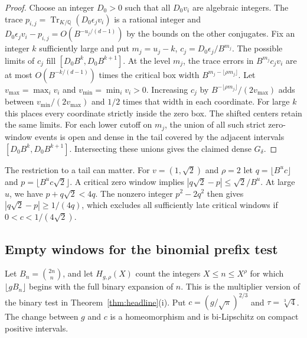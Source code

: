 \documentclass[11pt,reqno,a4paper]{amsart}
\theoremstyle{remark}
\begin{document}
\begin{proof}
Choose an integer \(D_0>0\) such that all \(D_0v_i\) are
algebraic integers. The trace
\(p_{i,j}=\operatorname{Tr}_{K/\mathbb Q}(D_0\epsilon_jv_i)\)
is a rational integer and
\(D_0\epsilon_jv_i-p_{i,j}=O(B^{-u_j/(d-1)})\) by the bounds on
the other conjugates. Fix an integer \(k\) sufficiently large
and put \(m_j=u_j-k\), \(c_j=D_0\epsilon_j/B^{m_j}\).
The possible limits of \(c_j\) fill
\([D_0B^k,D_0B^{k+1}]\). At the level \(m_j\), the trace errors
in \(B^{m_j}c_jv_i\) are at most \(O(B^{-k/(d-1)})\) times the
critical box width \(B^{m_j-\lfloor\rho m_j\rfloor}\).
Let \(v_{\max}=\max_i v_i\) and \(v_{\min}=\min_i v_i>0\).
Increasing \(c_j\) by
\(B^{-\lfloor\rho m_j\rfloor}/(2v_{\max})\) adds between
\(v_{\min}/(2v_{\max})\) and \(1/2\) times that width in each
coordinate. For large \(k\) this places every coordinate
strictly inside the zero box. The shifted centers retain the
same limits. For each lower cutoff on \(m_j\), the union of all
such strict zero-window events is open and dense in the tail
covered by the adjacent intervals
\([D_0B^k,D_0B^{k+1}]\). Intersecting these unions gives the
claimed dense \(G_\delta\).
\end{proof}

The restriction to a tail can matter. For \(v=(1,\sqrt2)\) and
\(\rho=2\) let \(q=\lfloor B^u c\rfloor\) and
\(p=\lfloor B^u c\sqrt2\rfloor\). A critical zero window implies
\(|q\sqrt2-p|\leq\sqrt2/B^u\). At large \(u\), we have
\(p+q\sqrt2<4q\). The nonzero integer \(p^2-2q^2\) then gives
\(|q\sqrt2-p|\geq1/(4q)\), which excludes all sufficiently late
critical windows if \(0<c<1/(4\sqrt2)\).

\subsection{Empty windows for the binomial prefix test}

Let \(B_n=\binom{2n}{n}\), and let \(H_{g,\rho}(X)\) count the
integers \(X\leq n\leq X^\rho\) for which \(\lfloor gB_n\rfloor\)
begins with the full binary expansion of \(n\). This is the
multiplier version of the binary test in
Theorem~\ref{thm:headline}(i). Put \(c=(g/\sqrt\pi)^{2/3}\) and
\(\tau=\sqrt[3]{4}\). The change between \(g\) and \(c\) is a
homeomorphism and is bi-Lipschitz on compact positive intervals.
\end{document}
